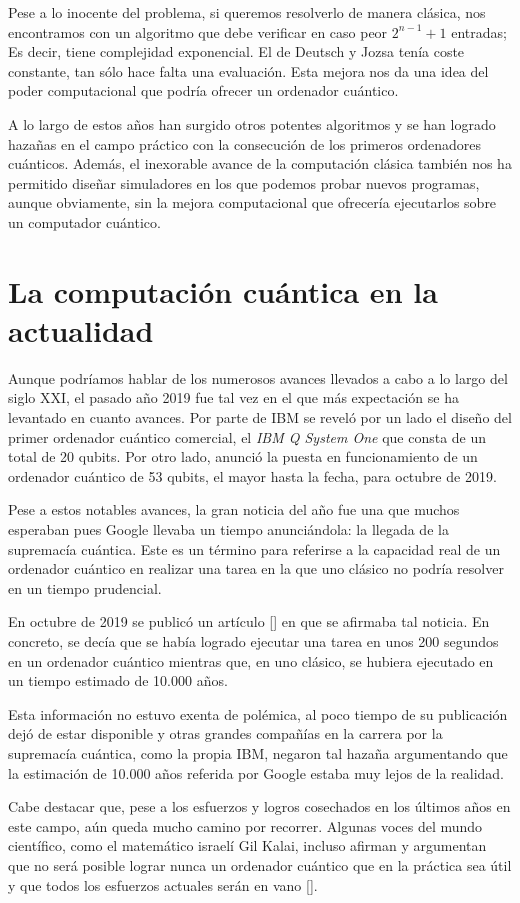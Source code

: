 Pese a lo inocente del problema, si queremos resolverlo de manera clásica, nos encontramos con un algoritmo que debe verificar en caso peor $2^{n-1}+1$ entradas; Es decir, tiene complejidad exponencial. El de Deutsch y Jozsa tenía coste constante, tan sólo hace falta una evaluación. Esta mejora nos da una idea del poder computacional que podría ofrecer un ordenador cuántico.

A lo largo de estos años han surgido otros potentes algoritmos y se han logrado hazañas en el campo práctico con la consecución de los primeros ordenadores cuánticos. Además, el inexorable avance de la computación clásica también nos ha permitido diseñar simuladores en los que podemos probar nuevos programas, aunque obviamente, sin la mejora computacional que ofrecería ejecutarlos sobre un computador cuántico.

\section{La computación cuántica en la actualidad}
Aunque podríamos hablar de los numerosos avances llevados a cabo a lo largo del siglo XXI, el pasado año 2019 fue tal vez en el que más expectación se ha levantado en cuanto avances. Por parte de IBM se reveló por un lado el diseño del primer ordenador cuántico comercial, el \textit{IBM Q System One} que consta de un total de 20 qubits. Por otro lado, anunció la puesta en funcionamiento de un ordenador cuántico de 53 qubits, el mayor hasta la fecha, para octubre de 2019.

Pese a estos notables avances, la gran noticia del año fue una que muchos esperaban pues Google llevaba un tiempo anunciándola: la llegada de la supremacía cuántica. Este es un término para referirse a la capacidad real de un ordenador cuántico en realizar una tarea en la que uno clásico no podría resolver en un tiempo prudencial.

En octubre de 2019 se publicó un artículo [\cite{arute2019quantum}] en que se afirmaba tal noticia. En concreto, se decía que se había logrado ejecutar una tarea en unos 200 segundos en un ordenador cuántico mientras que, en uno clásico, se hubiera ejecutado en un tiempo estimado de 10.000 años.

Esta información no estuvo exenta de polémica, al poco tiempo de su publicación dejó de estar disponible y otras grandes compañías en la carrera por la supremacía cuántica, como la propia IBM, negaron tal hazaña argumentando que la estimación de 10.000 años referida por Google estaba muy lejos de la realidad.

Cabe destacar que, pese a los esfuerzos y logros cosechados en los últimos años en este campo, aún queda mucho camino por recorrer. Algunas voces del mundo científico, como el matemático israelí Gil Kalai, incluso afirman y argumentan que no será posible lograr nunca un ordenador cuántico que en la práctica sea útil y que todos los esfuerzos actuales serán en vano [\cite{kalai2011quantum}].